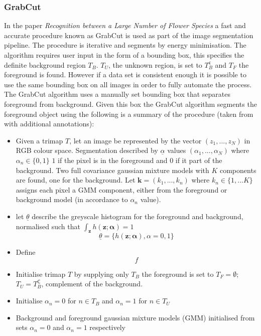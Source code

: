 \documentclass[11pt, titlepage, oneside]{article}
\theoremstyle{plain}
\theoremstyle{definition}
\theoremstyle{remark}
\begin{document}
		\subsubsection{GrabCut}
			In the paper \emph{Recognition between a Large Number of Flower Species}\cite{chai} a fast and accurate procedure known as GrabCut\cite{grabcut} is used as part of the image segmentation pipeline. The procedure is iterative and segments by energy minimisation. The algorithm requires user input in the form of a bounding box, this specifies the definite background region $T_B$. $T_U$, the unknown region, is set to $T_B^{\mathsf{c}}$ and $T_F$ the foreground is found. However if a data set is consistent enough it is possible to use the same bounding box on all images in order to fully automate the process. 
			\iffalse
			The GrabCut\cite{grabcut} algorithm uses a manually set bounding box that separates foreground from background. Given this box the GrabCut algorithm segments the foreground object using the following is a summary of the procedure (taken from \cite{grabcut} with additional annotations):
			\begin{itemize}
				\item Given a trimap $T$, let an image be represented by the vector $(z_1,...,z_N)$ in RGB colour space. Segmentation described by $\underline{\alpha}$ values $(\alpha_1,...,\alpha_N)$ where $\alpha_n \in \{0,1\}$ $1$ if the pixel is in the foreground and $0$ if it part of the background. Two full covariance gaussian mixture models with $K$ components are found, one for the background. Let $\mathbf{k} = (k_1,...,k_n)$ where $k_n\in \{1,...K\}$ assigns each pixel a GMM component, either from the foreground or background model (in accordance to $\alpha_n$ value).
				\item let $\underline{\theta}$ describe the greyscale histogram for the foreground and background, normalised such that $\int_{\mathbf{z}} h(\mathbf{z};\mathbf{\alpha}) = 1$
					\[
						\underline{\theta} = \{h(\mathbf{z};\mathbf{\alpha}), \alpha = 0,1 \}
					\]
				\item Define 
					\[
						f
					\]
				\item Initialise trimap $T$ by supplying only $T_B$ the foreground is set to $T_F = \emptyset$; $T_U = T_B^{\mathsf{C}}$, complement of the background.
				\item Initialise $\alpha_n = 0$ for $n \in T_B$ and $\alpha_n = 1$ for $n \in T_U$
				\item Background and foreground gaussian mixture models (GMM) initialised from sets $\alpha_n = 0$ and $\alpha_n = 1$ respectively
			\end{itemize}
\end{document}
